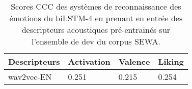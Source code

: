 \begin{table}[h]
  \centering
  \begin{tabular}{|l|l|l|l|}
  \hline
  Descripteurs   &Activation   &Valence  &Liking  \\
  \hline
  wav2vec-EN      &0.251      &0.215      &0.254 \\
  \hline
\end{tabular}
\caption{Scores CCC des systèmes de reconnaissance des émotions du biLSTM-4 en prenant en entrée des descripteurs acoustiques pré-entrainés sur l'ensemble de dev du corpus SEWA.}
\label{tab:sewa_wav2vec}
\end{table}
